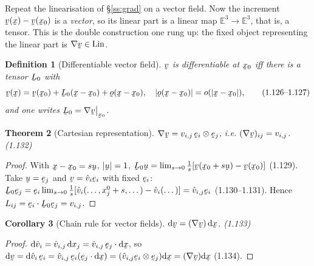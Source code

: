 \documentclass[17pt,a4paper]{extreport}
\DeclareRobustCommand{\vek}[1]{\underaccent{\tilde}{#1}}
\newcommand{\Et}{\mathbb{E}^{3}}
\newcommand{\Lin}{\operatorname{Lin}}
\newcommand{\grad}{\nabla}
\newcommand{\bu}{\vek{u}}
\newcommand{\bv}{\vek{v}}
\newcommand{\bx}{\vek{x}}
\newcommand{\bo}{\vek{o}}
\newcommand{\be}{\vek{e}}
\newcommand{\bL}{\vek{L}}
\newcommand{\dl}{\mathrm{d}}
\newcommand{\ip}[2]{#1\cdot#2}
\newcommand{\rest}[1]{\big|_{#1}}
\theoremstyle{scplain}
\newtheorem{theorem}{Theorem}[chapter]
\newtheorem{corollary}[theorem]{Corollary}
\theoremstyle{scdefn}
\newtheorem{definition}[theorem]{Definition}
\theoremstyle{scplain}
\begin{document}
Repeat the linearisation of \S\ref{ss:grad} on a vector field. Now the
increment $\bv(\bx)-\bv(\bx_0)$ is a \emph{vector}, so its linear part is a
linear map $\Et\to\Et$, that is, a tensor. This is the double construction
one rung up: the fixed object representing the linear part is
$\grad\bv\in\Lin$.

\begin{definition}[Differentiable vector field]\label{def:diffv}
$\bv$ is differentiable at $\bx_0$ iff there is a tensor $\bL_0$ with
\begin{equation}
\bv(\bx)=\bv(\bx_0)+\bL_0(\bx-\bx_0)+\bo(\bx-\bx_0),\quad
|\bo(\bx-\bx_0)|=o(|\bx-\bx_0|), \tag{1.126--1.127}\label{eq:1.126}
\end{equation}
and one writes $\bL_0=\grad\bv\rest{\bx_0}$.
\end{definition}

\begin{theorem}[Cartesian representation]\label{thm:gradvcart}
$\grad\bv=v_{i,j}\,\be_i\otimes\be_j$, i.e. $(\grad\bv)_{ij}=v_{i,j}$.
\hfill\textup{(1.132)}
\end{theorem}

\begin{proof}
With $\bx-\bx_0=s\bu$, $|\bu|=1$,
$\bL_0\bu=\lim_{s\to0}\tfrac1s[\bv(\bx_0+s\bu)-\bv(\bx_0)]$ (1.129). Take
$\bu=\be_j$ and $\bv=\hat v_i\be_i$ with fixed $\be_i$:
$\bL_0\be_j=\be_i\lim_{s\to0}\tfrac1s[\hat v_i(\dots,x_j^0+s,\dots)
-\hat v_i(\dots)]=\hat v_{i,j}\be_i$ (1.130--1.131). Hence
$L_{ij}=\ip{\be_i}{\bL_0\be_j}=v_{i,j}$.
\end{proof}

\begin{corollary}[Chain rule for vector fields]\label{cor:dv}
$\dl\bv=(\grad\bv)\,\dl\bx$. \hfill\textup{(1.133)}
\end{corollary}

\begin{proof}
$\dl\hat v_i=\hat v_{i,j}\,\dl x_j=\hat v_{i,j}\,\be_j\cdot\dl\bx$, so
$\dl\bv=\dl\hat v_i\,\be_i=\hat v_{i,j}\,\be_i(\be_j\cdot\dl\bx)
=(\hat v_{i,j}\be_i\otimes\be_j)\dl\bx=(\grad\bv)\dl\bx$ (1.134).
\end{proof}
\end{document}
